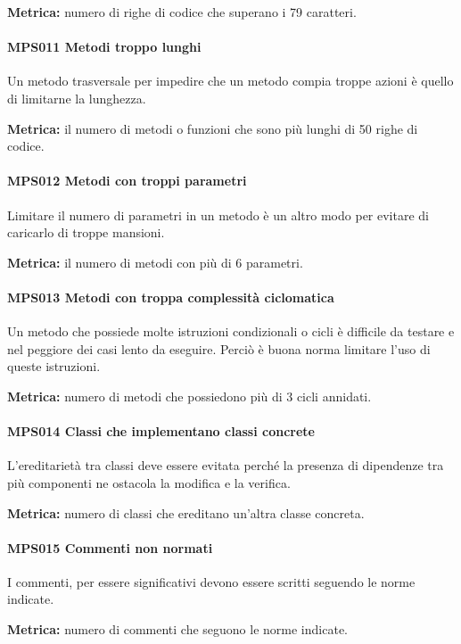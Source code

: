         \textbf{Metrica:} numero di righe di codice che superano i 79 caratteri.

        \paragraph{MPS011 Metodi troppo lunghi}
        Un metodo trasversale per impedire che un metodo compia troppe azioni è quello di limitarne la lunghezza.

        \textbf{Metrica:} il numero di metodi o funzioni che sono più lunghi di 50 righe di codice.

        \paragraph{MPS012 Metodi con troppi parametri}
        Limitare il numero di parametri in un metodo è un altro modo per evitare di caricarlo di troppe mansioni.

        \textbf{Metrica:} il numero di metodi con più di 6 parametri.

        \paragraph{MPS013 Metodi con troppa complessità ciclomatica}
        Un metodo che possiede molte istruzioni condizionali o cicli è difficile da testare e nel peggiore dei casi lento da eseguire. Perciò è buona norma limitare l'uso di queste istruzioni.

        \textbf{Metrica:} numero di metodi che possiedono più di 3 cicli annidati.

        \paragraph{MPS014 Classi che implementano classi concrete}
        L'ereditarietà tra classi deve essere evitata perché la presenza di dipendenze tra più componenti ne ostacola la modifica e la verifica.

        \textbf{Metrica:} numero di classi che ereditano un'altra classe concreta.

        \paragraph{MPS015 Commenti non normati}
        I commenti, per essere significativi devono essere scritti seguendo le norme indicate.

        \textbf{Metrica:} numero di commenti che seguono le norme indicate.

